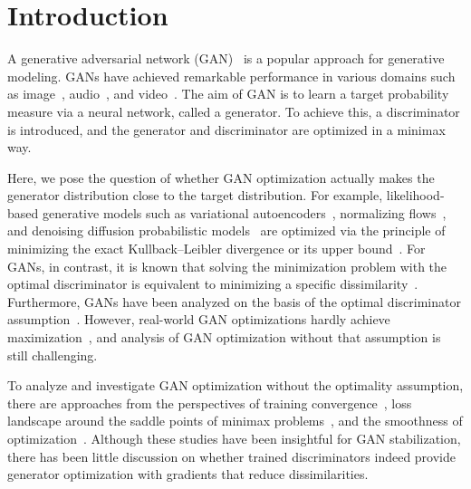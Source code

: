 \section{Introduction}
A generative adversarial network (GAN)~\citep{goodfellow2014generative} is a popular approach for generative modeling. GANs have achieved remarkable performance in various domains such as image~\citep{brock2018large,karras2019style,karras2021alias}, audio~\citep{kumar2019melgan,donahue2019adversarial,kong2020hifi}, and video~\citep{tulyakov2018mocogan,hao2021gancraft}. The aim of GAN is to learn a target probability measure via a neural network, called a generator. To achieve this, a discriminator is introduced, and the generator and discriminator are optimized in a minimax way.


Here, we pose the question of whether GAN optimization actually makes the generator distribution close to the target distribution. For example, likelihood-based generative models such as variational autoencoders~\citep{kingma2013auto,higgins2017beta,zhao2019infovae,takida2022sq-vae}, normalizing flows~\citep{tabak2010density,tabak2013family,rezende2015variational}, and denoising diffusion probabilistic models~\citep{ho2020denoising,song2020denoising,nichol2021improved} are optimized via the principle of minimizing the exact Kullback--Leibler divergence or its upper bound~\citep{jordan1999introduction}. For GANs, in contrast, it is known that solving the minimization problem with the optimal discriminator is equivalent to minimizing a specific dissimilarity~\citep{goodfellow2014generative,sebastian2016f,lim2017geometric,miyato2018spectral}. Furthermore, GANs have been analyzed on the basis of the optimal discriminator assumption~\citep{chu2020Smoothness}.
However, real-world GAN optimizations hardly achieve maximization~\citep{fiez2022minimax}, and analysis of GAN optimization without that assumption is still challenging.

To analyze and investigate GAN optimization without the optimality assumption, there are approaches from the perspectives of training convergence~\citep{mescheder2017the,nagarajan2017gradient,mescheder2018training,sanjabi2018convergence,xu2020understanding}, loss landscape around the saddle points of minimax problems~\citep{farnia2020gans,berard2019closer}, and the smoothness of optimization~\citep{fiez2022minimax}. Although these studies have been insightful for GAN stabilization, there has been little discussion on whether trained discriminators indeed provide generator optimization with gradients that reduce dissimilarities.

